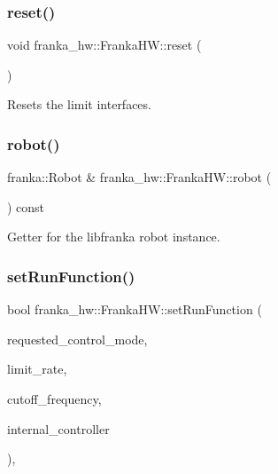 \subsubsection{\texorpdfstring{reset()}{reset()}}
{\footnotesize\ttfamily void franka\+\_\+hw\+::\+Franka\+H\+W\+::reset (\begin{DoxyParamCaption}{ }\end{DoxyParamCaption})\hspace{0.3cm}{\ttfamily [virtual]}}

Resets the limit interfaces. \mbox{\label{classfranka__hw_1_1_franka_h_w_ade38eaa271d71cebb8bce3635cf82169}} 
\subsubsection{\texorpdfstring{robot()}{robot()}}
{\footnotesize\ttfamily franka\+::\+Robot \& franka\+\_\+hw\+::\+Franka\+H\+W\+::robot (\begin{DoxyParamCaption}{ }\end{DoxyParamCaption}) const\hspace{0.3cm}{\ttfamily [virtual]}}

Getter for the libfranka robot instance. \mbox{\label{classfranka__hw_1_1_franka_h_w_a910bb11c6a3b14f027ad56dcf0d983c7}} 
\subsubsection{\texorpdfstring{set\+Run\+Function()}{setRunFunction()}}
{\footnotesize\ttfamily bool franka\+\_\+hw\+::\+Franka\+H\+W\+::set\+Run\+Function (\begin{DoxyParamCaption}\item[{const Control\+Mode \&}]{requested\+\_\+control\+\_\+mode,  }\item[{bool}]{limit\+\_\+rate,  }\item[{double}]{cutoff\+\_\+frequency,  }\item[{franka\+::\+Controller\+Mode}]{internal\+\_\+controller }\end{DoxyParamCaption})\hspace{0.3cm}{\ttfamily [protected]}, {\ttfamily [virtual]}}

